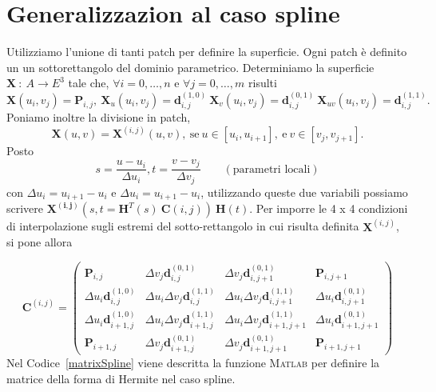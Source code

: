 \documentclass[12pt]{article}
\newcommand{\MATLAB}{\textsc{Matlab }}
\begin{document}
\section{Generalizzazion al caso spline}
Utilizziamo l'unione di tanti patch per definire la superficie.
Ogni patch è definito un un sottorettangolo del dominio parametrico.
Determiniamo la superficie $\mathbf{X} \ : \ A \rightarrow E^3$ tale che,
$\forall i = 0, \dots , n$ e $\forall j = 0, \dots , m$ risulti
$$\mathbf{X}(u_i, v_j) = \mathbf{P}_{i,j}, \ \mathbf{X}_u(u_i, v_j) = \mathbf{d}_{i,j}^{(1,0)} \  \mathbf{X}_v(u_i, v_j) = \mathbf{d}_{i,j}^{(0,1)} \  \mathbf{X}_{uv}(u_i, v_j) = \mathbf{d}_{i,j}^{(1,1)}.$$
Poniamo inoltre la divisione in patch,
$$\mathbf{X}(u, v) = \mathbf{X}^{(i,j)}(u, v),\  \text{se}\  u \in [u_i, u_{i+1}],\ \text{e} \ v \in [v_j, v_{j+1}].$$
Posto
$$ s = \frac{u-u_i}{\Delta u_i}, t = \frac{v - v_j}{\Delta v_j} \hspace{2em} (\text{parametri locali})$$
con $\Delta u_i = u_{i+1} - u_i$ e $\Delta u_i = u_{i+1} - u_i$, utilizzando queste due variabili
possiamo scrivere $\mathbf{X^{(i,j)}}(s,t = \mathbf{H}^T(s)\ \mathbf{C}(i,j)) \ \mathbf{H}(t).$
Per imporre le 4 x 4 condizioni di interpolazione sugli estremi del sotto-rettangolo in cui risulta definita $\mathbf{X}^{(i,j)}$, si pone allora

$$\mathbf{C}^{(i,j)} = 
\begin{pmatrix}
\mathbf{P}_{i,j}                     & \Delta v_j\mathbf{d}_{i,j}^{(0,1)}             & \Delta v_j\mathbf{d}_{i,j+1}^{(0,1)}             & \mathbf{P}_{i,j+1} \\
\Delta u_i\mathbf{d}_{i,j}^{(1,0)}   & \Delta u_i\Delta v_j\mathbf{d}_{i,j}^{(1,1)}   & \Delta u_i\Delta v_j\mathbf{d}_{i,j+1}^{(1,1)}   & \Delta u_i\mathbf{d}_{i,j+1}^{(0,1)} \\
\Delta u_i\mathbf{d}_{i+1,j}^{(1,0)} & \Delta u_i\Delta v_j\mathbf{d}_{i+1,j}^{(1,1)} & \Delta u_i\Delta v_j\mathbf{d}_{i+1,j+1}^{(1,1)} & \Delta u_i\mathbf{d}_{i+1,j+1}^{(0,1)} \\
\mathbf{P}_{i+1,j}                   & \Delta v_j\mathbf{d}_{i+1,j}^{(0,1)}           & \Delta v_j\mathbf{d}_{i+1,j+1}^{(0,1)}           & \mathbf{P}_{i+1,j+1} 
\end{pmatrix}  $$
Nel Codice~\ref{matrixSpline} viene descritta la funzione \MATLAB per definire la matrice della forma di Hermite
nel caso spline.

\end{document}
